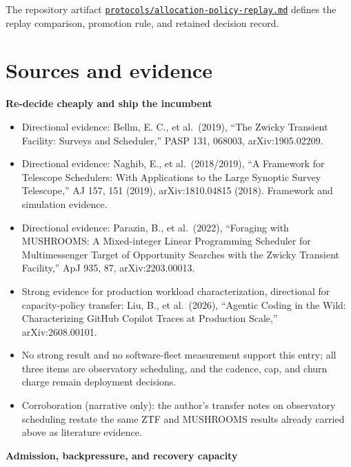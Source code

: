 The repository artifact \href{https://github.com/sjarmak/engineering-reliable-coding-agents/blob/main/protocols/allocation-policy-replay.md}{\texttt{protocols/allocation-policy-replay.md}} defines the replay comparison, promotion rule, and retained decision record.

\section*{Sources and evidence}

\textbf{Re-decide cheaply and ship the incumbent}

\begin{itemize}
\tightlist
\item
  Directional evidence: Bellm, E. C., et al.~(2019), ``The Zwicky Transient Facility: Surveys and Scheduler,'' PASP 131, 068003, arXiv:1905.02209.
\item
  Directional evidence: Naghib, E., et al.~(2018/2019), ``A Framework for Telescope Schedulers: With Applications to the Large Synoptic Survey Telescope,'' AJ 157, 151 (2019), arXiv:1810.04815 (2018). Framework and simulation evidence.
\item
  Directional evidence: Parazin, B., et al.~(2022), ``Foraging with MUSHROOMS: A Mixed-integer Linear Programming Scheduler for Multimessenger Target of Opportunity Searches with the Zwicky Transient Facility,'' ApJ 935, 87, arXiv:2203.00013.
\item
  Strong evidence for production workload characterization, directional for capacity-policy transfer: Liu, B., et al.~(2026), ``Agentic Coding in the Wild: Characterizing GitHub Copilot Traces at Production Scale,'' arXiv:2608.00101.
\item
  No strong result and no software-fleet measurement support this entry; all three items are observatory scheduling, and the cadence, cap, and churn charge remain deployment decisions.
\item
  Corroboration (narrative only): the author's transfer notes on observatory scheduling restate the same ZTF and MUSHROOMS results already carried above as literature evidence.
\end{itemize}

\textbf{Admission, backpressure, and recovery capacity}

